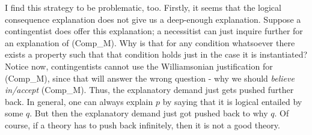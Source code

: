 I find this strategy to be problematic, too. 
Firstly, it seems that the logical consequence explanation does not give us a deep-enough explanation. Suppose a contingentist does offer this explanation; a necessitist can just inquire further for an explanation of (Comp_M). Why is that for any condition whatsoever there exists a property such that that condition holds just in the case it is instantiated? Notice now, contingentists cannot use the Williamsonian justification for (Comp_M), since that will answer the wrong question - why we should \emph{believe in/accept} (Comp_M). Thus, the explanatory demand just gets pushed further back. In general, one can always explain $p$ by saying that it is logical entailed by some $q$. But then the explanatory demand just got pushed back to why $q$. Of course, if a theory has to push back infinitely, then it is not a good theory. 

